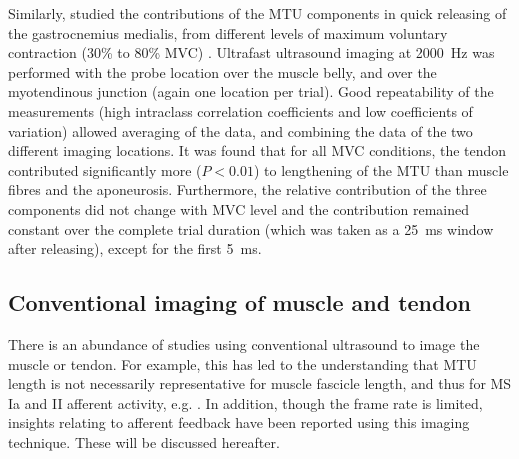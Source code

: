 Similarly, \citeauthor{farcy_interaction_2014} studied the contributions of the MTU components in quick releasing of the gastrocnemius medialis, from different levels of maximum voluntary contraction (30\% to 80\% MVC) \cite{farcy_interaction_2014}. Ultrafast ultrasound imaging at \SI{2000}{\hertz} was performed with the probe location over the muscle belly, and over the myotendinous junction (again one location per trial). Good repeatability of the measurements (high intraclass correlation coefficients and low coefficients of variation) allowed averaging of the data, and combining the data of the two different imaging locations. It was found that for all MVC conditions, the tendon contributed significantly more ($P<0.01$) to lengthening of the MTU than muscle fibres and the aponeurosis. 
Furthermore, the relative contribution of the three components did not change with MVC level and the contribution remained constant over the complete trial duration (which was taken as a \SI{25}{\milli\second} window after releasing), except for the first \SI{5}{\milli\second}. 






\subsection{Conventional imaging of muscle and tendon}
There is an abundance of studies using conventional ultrasound to image the muscle or tendon. For example, this has led to the understanding that MTU length is not necessarily representative for muscle fascicle length, and thus for MS Ia and II afferent activity, e.g. \cite{maas_is_2009, cronin_automatic_2011}. In addition, though the frame rate is limited, \tred[many] insights relating to afferent feedback have been reported using this imaging technique. These will be discussed hereafter. 



